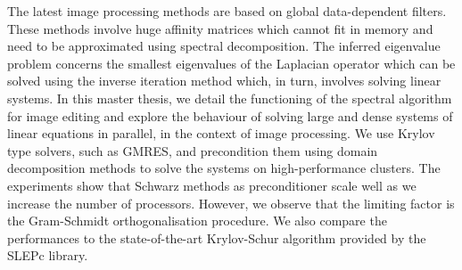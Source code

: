 The latest image processing methods are based on global data-dependent filters.
These methods involve huge affinity matrices which cannot fit in memory and need to be approximated using spectral decomposition.
The inferred eigenvalue problem concerns the smallest eigenvalues of the Laplacian operator which can be solved using the inverse iteration method which, in turn, involves solving linear systems.
In this master thesis, we detail the functioning of the spectral algorithm for image editing and explore the behaviour of solving large and dense systems of linear equations in parallel, in the context of image processing.
We use Krylov type solvers, such as GMRES, and precondition them using domain decomposition methods to solve the systems on high-performance clusters.
The experiments show that Schwarz methods as preconditioner scale well as we increase the number of processors.
However, we observe that the limiting factor is the Gram-Schmidt orthogonalisation procedure.
We also compare the performances to the state-of-the-art Krylov-Schur algorithm provided by the SLEPc library.
